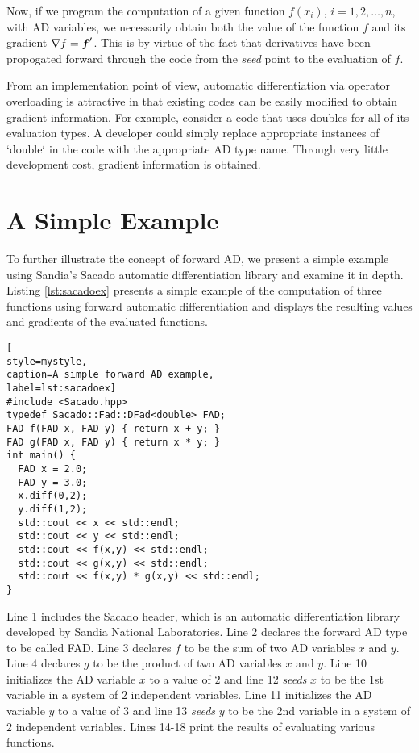 Now, if we program the computation of a given function
$f(x_i)$, $i=1,2,\dots,n$, with AD variables, we necessarily obtain both the
value of the function $f$ and its gradient $\nabla f = \boldsymbol{f}'$. This is by
virtue of the fact that derivatives have been propogated forward through the
code from the \emph{seed} point to the evaluation of $f$.

From an implementation point of view, automatic differentiation via operator
overloading is attractive in that existing codes can be easily modified to
obtain gradient information. For example, consider a code that uses doubles
for all of its evaluation types. A developer could simply replace appropriate
instances of `double` in the code with the appropriate AD type name. Through
very little development cost, gradient information is obtained.

\section{A Simple Example}

To further illustrate the concept of forward AD, we present a simple example
using Sandia's Sacado automatic differentiation library and examine it in
depth. Listing \ref{lst:sacadoex} presents a simple example of the
computation of three functions using forward automatic differentiation and
displays the resulting values and gradients of the evaluated functions.

\begin{lstlisting}[
style=mystyle,
caption=A simple forward AD example,
label=lst:sacadoex]
#include <Sacado.hpp>
typedef Sacado::Fad::DFad<double> FAD;
FAD f(FAD x, FAD y) { return x + y; }
FAD g(FAD x, FAD y) { return x * y; }
int main() {
  FAD x = 2.0;
  FAD y = 3.0;
  x.diff(0,2);
  y.diff(1,2);
  std::cout << x << std::endl;
  std::cout << y << std::endl;
  std::cout << f(x,y) << std::endl;
  std::cout << g(x,y) << std::endl;
  std::cout << f(x,y) * g(x,y) << std::endl;
}
\end{lstlisting}

Line 1 includes the Sacado header, which is an automatic differentiation
library developed by Sandia National Laboratories. Line 2 declares the
forward AD type to be called FAD. Line 3 declares $f$ to be the sum of two
AD variables $x$ and $y$. Line $4$ declares $g$ to be the product of two AD
variables $x$ and $y$. Line 10 initializes the AD variable $x$ to a value of
$2$ and line 12 \emph{seeds} $x$ to be the 1st variable in a system of $2$
independent variables. Line 11 initializes the AD variable $y$ to a value of
$3$ and line 13 \emph{seeds} $y$ to be the 2nd variable in a system of $2$
independent variables. Lines 14-18 print the results of evaluating various
functions.

